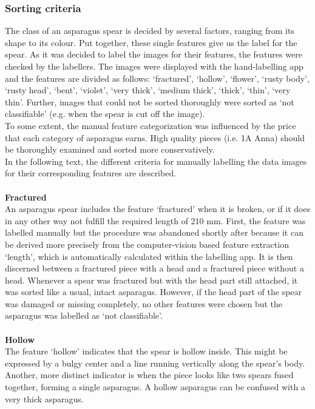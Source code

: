 \subsubsection{Sorting criteria}

The class of an asparagus spear is decided by several factors, ranging from its shape to its colour. Put together, these single features give us the label for the spear. As it was decided to label the images for their features, the features were checked by the labellers. The images were displayed with the hand-labelling app and the features are divided as follows: ‘fractured’, ‘hollow’, ‘flower’, ‘rusty body’, ‘rusty head’, ‘bent’, ‘violet’, ‘very thick’, ‘medium thick’, ‘thick’, ‘thin’, ‘very thin’. Further, images that could not be sorted thoroughly were sorted as ‘not classifiable’ (e.g. when the spear is cut off the image). \\
To some extent, the manual feature categorization was influenced by the price that each category of asparagus earns. High quality pieces (i.e. 1A Anna) should be thoroughly examined and sorted more conservatively. \\
In the following text, the different criteria for manually labelling the data images for their corresponding features are described. \\
 \\
\textbf{Fractured} \\
An asparagus spear includes the feature ‘fractured’ when it is broken, or if it does in any other way not fulfill the required length of 210 mm.
First, the feature was labelled manually but the procedure was abandoned shortly after because it can be derived  more precisely from the computer-vision based feature extraction ‘length’, which is automatically calculated within the labelling app.
It is then discerned between a fractured piece with a head and a fractured piece without a head. Whenever a spear was fractured but with the head part still attached, it was sorted like a usual, intact asparagus. However, if the head part of the spear was damaged or missing completely, no other features were chosen but the asparagus was labelled as ‘not classifiable’. \\
 \\
\textbf{Hollow} \\
The feature ‘hollow’ indicates that the spear is hollow inside.
This might be expressed by a bulgy center and a line running vertically along the spear’s body. Another, more distinct indicator is when the piece looks like two spears fused together, forming a single asparagus. A hollow asparagus can be confused with a very thick asparagus. \\
